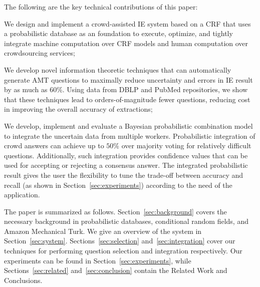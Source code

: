 
The following are the key technical contributions of this paper:
\begin{compactitemize}
\item We design and implement a crowd-assisted IE system \sysName based on a CRF that uses a probabilistic database as an foundation to execute, optimize, and tightly integrate machine computation over CRF models and human computation over crowdsourcing services;
\item We develop novel information theoretic techniques that can automatically generate AMT questions to maximally reduce uncertainty and errors in IE result by as much as $60\%$. Using data from DBLP and PubMed repositories, we show that these techniques lead to orders-of-magnitude fewer questions, reducing cost in improving the overall accuracy of extractions;
\item We develop, implement and evaluate a Bayesian probabilistic combination model to integrate the uncertain data from multiple workers. Probabilistic integration of crowd answers can achieve up to $50\%$ over majority voting for relatively difficult questions. Additionally, such integration provides confidence values that can be used for accepting or rejecting a consensus answer.  The integrated probabilistic result gives the user the flexibility to tune the trade-off between accuracy and recall (as shown in Section~\ref{sec:experiments}) according to the need of the application.
\end{compactitemize}
\vspace{1mm}

The paper is summarized as follows.  Section~\ref{sec:background} covers the necessary background in probabilistic databases, conditional random fields, and Amazon Mechanical Turk.  We give an overview of the \sysName system in Section~\ref{sec:system}.  Sections~\ref{sec:selection} and~\ref{sec:integration} cover our techniques for performing question selection and integration respectively.  Our experiments can be found in Section~\ref{sec:experiments}, while Sections~\ref{sec:related} and~\ref{sec:conclusion} contain the Related Work and Conclusions.

